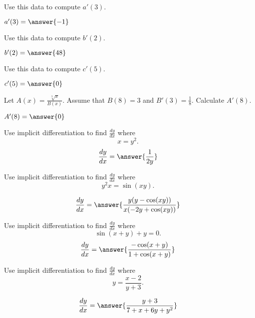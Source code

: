 \documentclass[handout]{ximera}
\begin{document}
\begin{exercise}
Use this data to compute $a'(3)$.

	$a'(3) = \answer{-1}$

\end{exercise}


\begin{exercise}
Use this data to compute $b'(2)$.

	$b'(2) = \answer{48}$

\end{exercise}


\begin{exercise}
Use this data to compute $c'(5)$.

	$c'(5) = \answer{0}$

\end{exercise}

\begin{exercise}
Let $A(x) = \frac{\sqrt[3]{x}}{B(x)}$.  Assume that $B(8) = 3$ and $B'(3) = \frac{1}{8}$.  Calculate $A'(8)$.

	$A'(8) = \answer{0}$


\end{exercise}

\begin{exercise}
Use implicit differentiation to find $\frac{dy}{dx}$ where
\[
x = y^2.
\]
\[
\frac{dy}{dx} = \answer{\frac{1}{2y}}
\]

\end{exercise}

\begin{exercise}
Use implicit differentiation to find $\frac{dy}{dx}$ where
\[
y^2x = \sin(xy).
\]

\[
\frac{dy}{dx} = \answer{\frac{y(y-\cos(xy))}{x(-2y+\cos(xy))}}
\]

\end{exercise}

\begin{exercise}
Use implicit differentiation to find $\frac{dy}{dx}$ where
\[
\sin(x+y)+y = 0.
\]
\[
\frac{dy}{dx} = \answer{\frac{-\cos(x+y)}{1+\cos(x+y)}}
\]
\end{exercise}

\begin{exercise}
Use implicit differentiation to find $\frac{dy}{dx}$ where
\[
y = \frac{x-2}{y+3}.
\]

\[
\frac{dy}{dx} = \answer{\frac{y+3}{7+x+6y+y^2}}
\]

\end{exercise}
\end{document}
